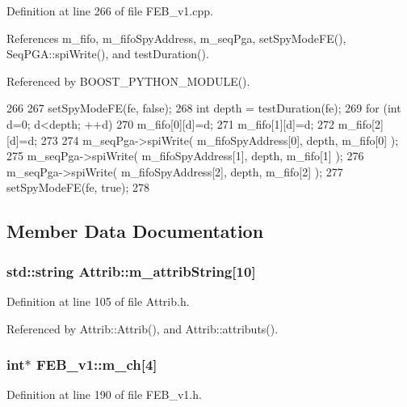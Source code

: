 Definition at line 266 of file FEB\_\-v1.cpp.

References m\_\-fifo, m\_\-fifoSpyAddress, m\_\-seqPga, setSpyModeFE(), SeqPGA::spiWrite(), and testDuration().

Referenced by BOOST\_\-PYTHON\_\-MODULE().


\begin{DoxyCode}
266                                   {
267   setSpyModeFE(fe, false);
268   int depth = testDuration(fe);
269   for (int d=0; d<depth; ++d){
270     m_fifo[0][d]=d;
271     m_fifo[1][d]=d;
272     m_fifo[2][d]=d; 
273   }
274   m_seqPga->spiWrite( m_fifoSpyAddress[0], depth, m_fifo[0] );
275   m_seqPga->spiWrite( m_fifoSpyAddress[1], depth, m_fifo[1] );
276   m_seqPga->spiWrite( m_fifoSpyAddress[2], depth, m_fifo[2] );
277   setSpyModeFE(fe, true);
278 }
\end{DoxyCode}


\subsection{Member Data Documentation}
\hypertarget{classAttrib_a3414521d7a82476e874b25a5407b5e63}{
\subsubsection[{m\_\-attribString}]{\setlength{\rightskip}{0pt plus 5cm}std::string {\bf Attrib::m\_\-attribString}\mbox{[}10\mbox{]}}}
\label{classAttrib_a3414521d7a82476e874b25a5407b5e63}


Definition at line 105 of file Attrib.h.

Referenced by Attrib::Attrib(), and Attrib::attributs().\hypertarget{classFEB__v1_a383c35f10769b16c6a719494594899c6}{
\subsubsection[{m\_\-ch}]{\setlength{\rightskip}{0pt plus 5cm}int$\ast$ {\bf FEB\_\-v1::m\_\-ch}\mbox{[}4\mbox{]}}}
\label{classFEB__v1_a383c35f10769b16c6a719494594899c6}


Definition at line 190 of file FEB\_\-v1.h.

